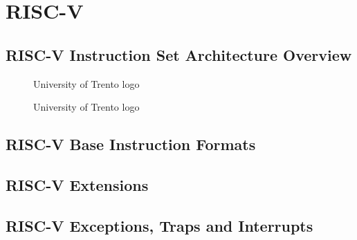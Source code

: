 \chapter{RISC-V}
\label{cha:riscv}

\lipsum[1]

\section{RISC-V Instruction Set Architecture Overview}
\label{sec:riscv_isa}

\lipsum[1]

\begin{figure}[htbp]
  \centering
  \def\stackalignment{r} %
  {\scriptsize }
  \caption{University of Trento logo}
  \label{fig:csr}
\end{figure}

\begin{figure}[htbp]
  \centering
  \def\stackalignment{r} %
  {\scriptsize }
  \caption{University of Trento logo}
  \label{fig:test}
\end{figure}

\section{RISC-V Base Instruction Formats}
\label{sec:riscv_bif}

\lipsum[1]

\section{RISC-V Extensions}
\label{sec:riscv_extensions}

\lipsum[1]

\section{RISC-V Exceptions, Traps and Interrupts}
\label{sec:riscv_eti}

\lipsum[1]

